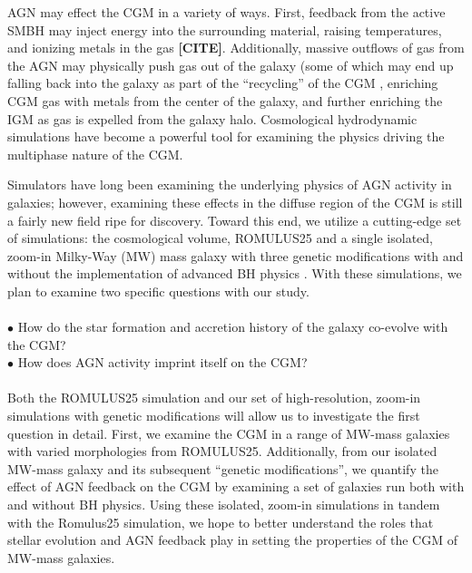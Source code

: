 \documentclass[]{emulateapj}
\begin{document}
AGN may effect the CGM in a variety of ways. First, feedback from the active SMBH may inject energy into the surrounding material, raising temperatures, and ionizing metals in the gas \textbf{[CITE]}. Additionally, massive outflows of gas from the AGN may physically push gas out of the galaxy (some of which may end up falling back into the galaxy as part of the ``recycling'' of the CGM \citep[MORE]{Tumlinson2017}, enriching CGM gas with metals from the center of the galaxy, and further enriching the IGM as gas is expelled from the galaxy halo. Cosmological hydrodynamic simulations have become a powerful tool for examining the physics driving the multiphase nature of the CGM. 

Simulators have long been examining the underlying physics of AGN activity in galaxies; however, examining these effects in the diffuse region of the CGM is still a fairly new field ripe for discovery. Toward this end, we utilize a cutting-edge set of simulations: the cosmological volume, ROMULUS25 \citep{Tremmel2017} and a single isolated, zoom-in Milky-Way (MW) mass galaxy \citep{Roth2016,Pontzen2016} with three genetic modifications with and without the implementation of advanced BH physics \citep{Tremmel2015}. With these simulations, we plan to examine two specific questions with our study. \\
\\
$\bullet$ How do the star formation and accretion history of the galaxy co-evolve with the CGM? \\
$\bullet$ How does AGN activity imprint itself on the CGM? \\
\\
Both the ROMULUS25 simulation and our set of high-resolution, zoom-in simulations with genetic modifications will allow us to investigate the first question in detail. First, we examine the CGM in a range of MW-mass galaxies with varied morphologies from ROMULUS25. Additionally, from our isolated MW-mass galaxy and its subsequent ``genetic modifications'', we quantify the effect of AGN feedback on the CGM by examining a set of galaxies run both with and without BH physics. Using these isolated, zoom-in simulations in tandem with the Romulus25 simulation, we hope to better understand the roles that stellar evolution and AGN feedback play in setting the properties of the CGM of MW-mass galaxies.
\end{document}
